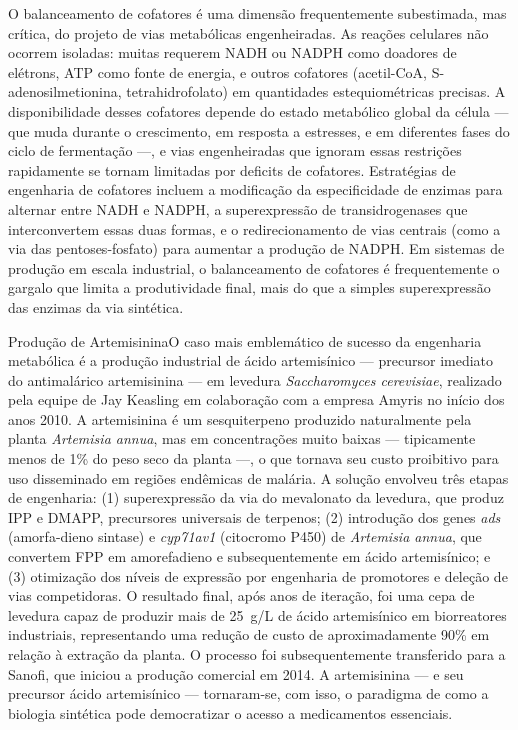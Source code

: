 O balanceamento de cofatores é uma dimensão frequentemente subestimada, mas crítica, do projeto de vias metabólicas engenheiradas. As reações celulares não ocorrem isoladas: muitas requerem NADH ou NADPH como doadores de elétrons, ATP como fonte de energia, e outros cofatores (acetil-CoA, S-adenosilmetionina, tetrahidrofolato) em quantidades estequiométricas precisas. A disponibilidade desses cofatores depende do estado metabólico global da célula --- que muda durante o crescimento, em resposta a estresses, e em diferentes fases do ciclo de fermentação ---, e vias engenheiradas que ignoram essas restrições rapidamente se tornam limitadas por deficits de cofatores. Estratégias de engenharia de cofatores incluem a modificação da especificidade de enzimas para alternar entre NADH e NADPH, a superexpressão de transidrogenases que interconvertem essas duas formas, e o redirecionamento de vias centrais (como a via das pentoses-fosfato) para aumentar a produção de NADPH. Em sistemas de produção em escala industrial, o balanceamento de cofatores é frequentemente o gargalo que limita a produtividade final, mais do que a simples superexpressão das enzimas da via sintética.

\begin{exemplo}{Produção de Artemisinina}{O caso mais emblemático de sucesso da engenharia metabólica é a produção industrial de ácido artemisínico --- precursor imediato do antimalárico artemisinina --- em levedura \textit{Saccharomyces cerevisiae}, realizado pela equipe de Jay Keasling em colaboração com a empresa Amyris no início dos anos 2010. A artemisinina é um sesquiterpeno produzido naturalmente pela planta \textit{Artemisia annua}, mas em concentrações muito baixas --- tipicamente menos de 1\% do peso seco da planta ---, o que tornava seu custo proibitivo para uso disseminado em regiões endêmicas de malária. A solução envolveu três etapas de engenharia: (1) superexpressão da via do mevalonato da levedura, que produz IPP e DMAPP, precursores universais de terpenos; (2) introdução dos genes \textit{ads} (amorfa-dieno sintase) e \textit{cyp71av1} (citocromo P450) de \textit{Artemisia annua}, que convertem FPP em amorefadieno e subsequentemente em ácido artemisínico; e (3) otimização dos níveis de expressão por engenharia de promotores e deleção de vias competidoras. O resultado final, após anos de iteração, foi uma cepa de levedura capaz de produzir mais de 25~g/L de ácido artemisínico em biorreatores industriais, representando uma redução de custo de aproximadamente 90\% em relação à extração da planta. O processo foi subsequentemente transferido para a Sanofi, que iniciou a produção comercial em 2014. A artemisinina --- e seu precursor ácido artemisínico --- tornaram-se, com isso, o paradigma de como a biologia sintética pode democratizar o acesso a medicamentos essenciais.}
\end{exemplo}



